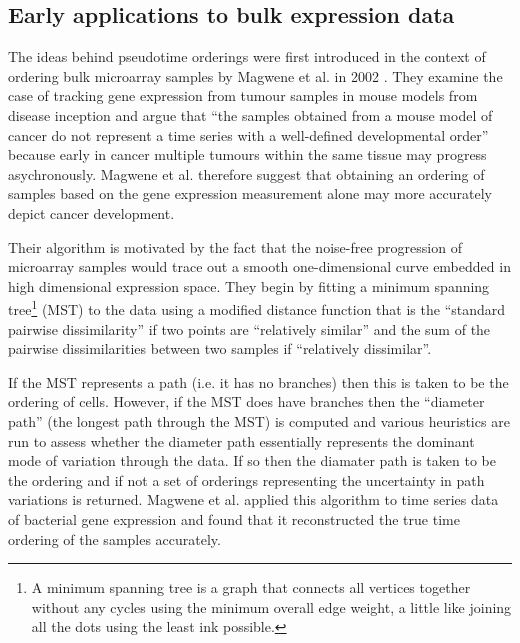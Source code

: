 \subsection{Early applications to bulk expression data} \label{sec:int:early}

The ideas behind pseudotime orderings were first introduced in the context of ordering bulk microarray samples by Magwene et al. in 2002 \cite{Magwene2003-bm}. They examine the case of tracking gene expression from tumour samples in mouse models from disease inception and argue that ``the samples obtained from a mouse model of cancer do not represent a time series with a well-defined developmental order''
because early in cancer multiple tumours within the same tissue may progress asychronously. Magwene et al. therefore suggest that obtaining an ordering of samples based on the gene expression measurement alone may more accurately depict cancer development.

Their algorithm is motivated by the fact that the noise-free progression of microarray samples would trace out a smooth one-dimensional curve embedded in high dimensional expression space. They begin by fitting a minimum spanning tree\footnote{
A minimum spanning tree is a graph that connects all vertices together without any cycles using the minimum overall edge weight, a little like joining all the dots using the least ink possible.
} (MST) to the data using a modified distance function that is the ``standard pairwise dissimilarity'' if two points are ``relatively similar'' and the sum of the pairwise dissimilarities between two samples if ``relatively dissimilar''.

If the MST represents a path (i.e. it has no branches) then this is taken to be the ordering of cells. However, if the MST does have branches then the ``diameter path'' (the longest path through the MST) is computed and various heuristics are run to assess whether the diameter path essentially represents the dominant mode of variation through the data. If so then the diamater path is taken to be the ordering and if not a set of orderings representing the uncertainty in path variations is returned. Magwene et al. applied this algorithm to time series data of bacterial gene expression and found that it reconstructed the true time ordering of the samples accurately.

